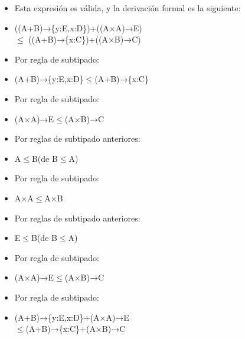\documentclass{article}
\begin{document}
\begin{itemize}
\begin{itemize}
            \begin{center}
                \begin{itemize}
                    \item Esta expresión es válida, y la derivación formal es la siguiente:
                    \item[ ] ((A+B)→\{y:E,x:D\})+((A×A)→E)\\ $\leq$ ((A+B)→\{x:C\})+((A×B)→C)
                    \item Por regla de subtipado:
                    \item[ ] (A+B)→\{y:E,x:D\}$\leq$(A+B)→\{x:C\}
                    \item Por regla de subtipado:
                    \item[ ] (A×A)→E$\leq$(A×B)→C
                    \item Por reglas de subtipado anteriores:
                    \item[ ] A$\leq$B(de B$\leq$A)
                    \item Por regla de subtipado:
                    \item[ ] A×A$\leq$A×B
                    \item Por reglas de subtipado anteriores:
                    \item[ ] E$\leq$B(de B$\leq$A)
                    \item Por regla de subtipado:
                    \item[ ] (A×A)→E$\leq$(A×B)→C
                    \item Por regla de subtipado:
                    \item[ ] (A+B)→\{y:E,x:D\}+(A×A)→E\\ $\leq$(A+B)→\{x:C\}+(A×B)→C
                \end{itemize}
            \end{center}
 



\end{itemize}
\end{itemize}
\end{document}
